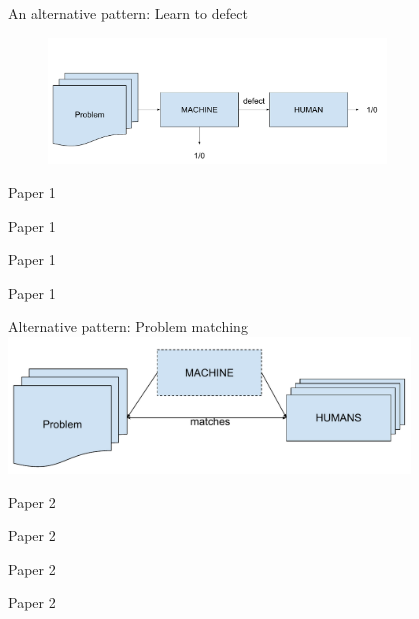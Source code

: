 \documentclass[11pt]{beamer}
\begin{document}
\begin{frame}{An alternative pattern: Learn to defect}
\begin{figure}[t!]
	\centering
	\includegraphics[width=0.8\textwidth]{Figures/defect.pdf}
\end{figure}
\end{frame}


\begin{frame}{Paper 1}
\end{frame}

\begin{frame}{Paper 1}
\end{frame}


\begin{frame}{Paper 1}
\end{frame}


\begin{frame}{Paper 1}
\end{frame}


\begin{frame}{Alternative pattern: Problem matching}
	\centering
\includegraphics[width=0.8\textwidth]{Figures/matching.pdf}
\end{frame}


\begin{frame}{Paper 2}
\end{frame}

\begin{frame}{Paper 2}
\end{frame}


\begin{frame}{Paper 2}
\end{frame}


\begin{frame}{Paper 2}
\end{frame}
\end{document}
